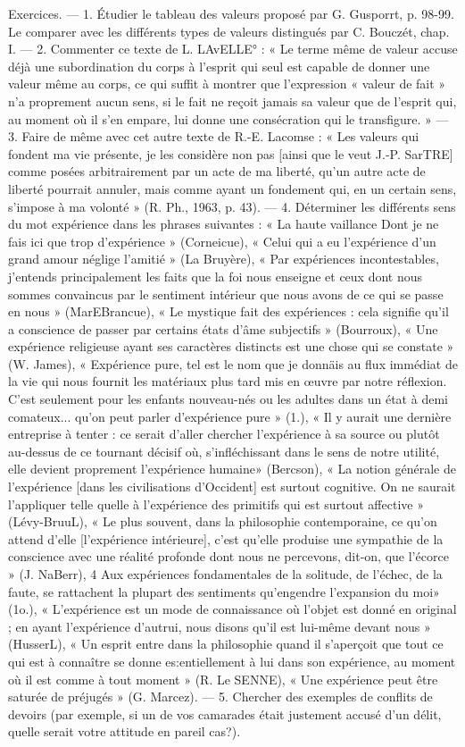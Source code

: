 Exercices. — 1. Étudier le tableau des valeurs proposé par G. Gusporrt,
p. 98-99. Le comparer avec les différents types de valeurs distingués par
C. Bouczét, chap. I. — 2. Commenter ce texte de L. LAvELLE° : « Le terme
même de valeur accuse déjà une subordination du corps à l’esprit qui seul
est capable de donner une valeur même au corps, ce qui suffit à montrer
que l'expression « valeur de fait » n’a proprement aucun sens, si le fait ne
reçoit jamais sa valeur que de l'esprit qui, au moment où il s’en empare,
lui donne une consécration qui le transfigure. » — 3. Faire de même avec cet
autre texte de R.-E. Lacomse : « Les valeurs qui fondent ma vie présente,
je les considère non pas [ainsi que le veut J.-P. SarTRE] comme posées
arbitrairement par un acte de ma liberté, qu’un autre acte de liberté pourrait
annuler, mais comme ayant un fondement qui, en un certain sens,
s'impose à ma volonté » (R. Ph., 1963, p. 43). — 4. Déterminer les différents
sens du mot expérience dans les phrases suivantes : « La haute vaillance Dont
je ne fais ici que trop d'expérience » (Corneicue), « Celui qui a eu l’expérience
d’un grand amour néglige l'amitié » (La Bruyère), « Par expériences
incontestables, j'entends principalement les faits que la foi nous enseigne et
ceux dont nous sommes convaincus par le sentiment intérieur que nous
avons de ce qui se passe en nous » (MarEBrancue), « Le mystique fait des
expériences : cela signifie qu’il a conscience de passer par certains états d'âme
subjectifs » (Bourroux), « Une expérience religieuse ayant ses caractères
distincts est une chose qui se constate » (W. James), « Expérience pure, tel
est le nom que je donnäis au flux immédiat de la vie qui nous fournit les
matériaux plus tard mis en œuvre par notre réflexion. C’est seulement pour
les enfants nouveau-nés ou les adultes dans un état à demi comateux...
qu’on peut parler d'expérience pure » (1.), « Il y aurait une dernière entreprise
à tenter : ce serait d'aller chercher l'expérience à sa source ou plutôt
au-dessus de ce tournant décisif où, s’infléchissant dans le sens de notre
utilité, elle devient proprement l'expérience humaine» (Bercson), « La
notion générale de l'expérience [dans les civilisations d'Occident] est surtout
cognitive. On ne saurait l’appliquer telle quelle à l'expérience des primitifs
qui est surtout affective » (Lévy-BruuL), « Le plus souvent, dans la philosophie
contemporaine, ce qu’on attend d'elle [l'expérience intérieure],
c’est qu’elle produise une sympathie de la conscience avec une réalité profonde
dont nous ne percevons, dit-on, que l'écorce » (J. NaBerr), 4 Aux
expériences fondamentales de la solitude, de l’échec, de la faute, se rattachent
la plupart des sentiments qu’engendre l’expansion du moi» (1o.),
« L'expérience est un mode de connaissance où l’objet est donné en original ;
en ayant l'expérience d'autrui, nous disons qu'il est lui-même devant nous »
(HusserL), « Un esprit entre dans la philosophie quand il s'aperçoit que
tout ce qui est à connaître se donne es:entiellement à lui dans son expérience,
au moment où il est comme à tout moment » (R. Le SENNE), « Une
expérience peut être saturée de préjugés » (G. Marcez). — 5. Chercher des
exemples de conflits de devoirs (par exemple, si un de vos camarades était justement
accusé d'un délit, quelle serait votre attitude en pareil cas?).

